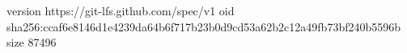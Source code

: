 version https://git-lfs.github.com/spec/v1
oid sha256:ccaf6e8146d1e4239da64b6f717b23b0d9cd53a62b2c12a49fb73bf240b5596b
size 87496

